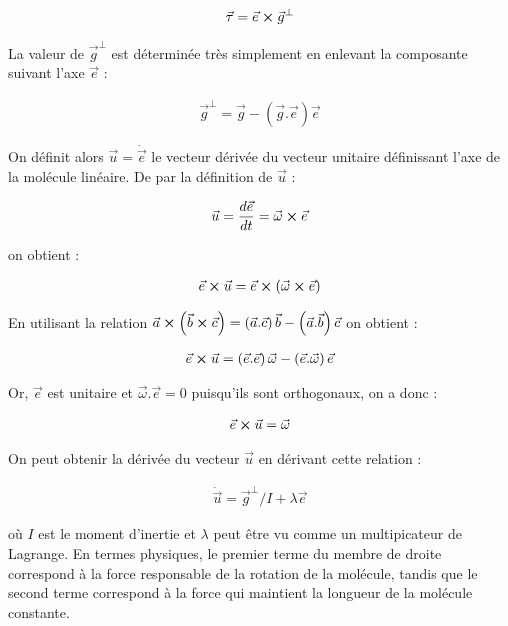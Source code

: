 \documentclass[12pt]{article}
\begin{document}
\begin{eqnarray}
\vec{\tau}=\vec{e}\boldsymbol\times \vec{g}^{\perp}
\end{eqnarray}

La valeur de $\vec{g}^{\perp}$ est déterminée très simplement en enlevant la composante suivant l'axe $\vec{e}$ :

\begin{eqnarray}
\vec{g}^{\perp}=\vec{g}-\left(\vec{g}.\vec{e}\right) \vec{e}
\end{eqnarray}

On définit alors $\vec{u}=\dot{\vec{e}}$ le vecteur dérivée du vecteur unitaire définissant l'axe de la molécule linéaire. De par la définition de $\vec{u}$ :

\begin{eqnarray}
\vec{u}=\dfrac{d\vec{e}}{dt}=\vec{\omega}\boldsymbol\times \vec{e}
\end{eqnarray}

on obtient :

\begin{eqnarray}
\vec{e}\boldsymbol\times\vec{u}=\vec{e}\boldsymbol\times\left(\vec{\omega}\boldsymbol\times\vec{e}\right)
\end{eqnarray}

En utilisant la relation $\vec{a}\boldsymbol\times\left(\vec{b}\boldsymbol\times\vec{c}\right)=\left(\vec{a}.\vec{c}\right)\vec{b}-\left(\vec{a}.\vec{b}\right)\vec{c}$ on obtient :

\begin{eqnarray}
\vec{e}\boldsymbol\times\vec{u}=\left(\vec{e}.\vec{e}\right)\vec{\omega}-\left(\vec{e}.\vec{\omega}\right)\vec{e}
\end{eqnarray}

Or, $\vec{e}$ est unitaire et $\vec{\omega}.\vec{e}=0$ puisqu'ils sont orthogonaux, on a donc :

\begin{eqnarray}
\vec{e}\boldsymbol\times\vec{u}=\vec{\omega}
\end{eqnarray}

On peut obtenir la dérivée du vecteur $\vec{u}$ en dérivant cette relation :

\begin{eqnarray} \label{eqn:dotu}
\dot{\vec{u}}=\vec{g}^\perp / I + \lambda \vec{e} 
\end{eqnarray}

où $I$ est le moment d'inertie et $\lambda$ peut être vu comme un multipicateur de Lagrange. En termes physiques, le premier terme du membre de droite correspond à la force responsable de la rotation de la molécule, tandis que le second terme correspond à la force qui maintient la longueur de la molécule constante.
\end{document}
